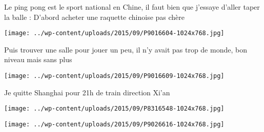  \newline
 Le ping pong est le sport national en Chine, il faut bien que j'essaye d'aller taper la balle : \newline
 D'abord acheter une raquette chinoise pas chère \newline
 \newline
\centerline{\texttt{[image: ../wp-content/uploads/2015/09/P9016604-1024x768.jpg]} } 
 \newline
 Puis trouver une salle pour jouer un peu, il n'y avait pas trop de monde, bon niveau mais sans plus \newline
 \newline
\centerline{\texttt{[image: ../wp-content/uploads/2015/09/P9016609-1024x768.jpg]} } 
 \newline
 Je quitte Shanghai pour 21h de train direction Xi'an \newline
 \newline
\centerline{\texttt{[image: ../wp-content/uploads/2015/09/P8316548-1024x768.jpg]} } 
 \newline
 \newline
\centerline{\texttt{[image: ../wp-content/uploads/2015/09/P9026616-1024x768.jpg]} } 
 \newline

\newpage
 
